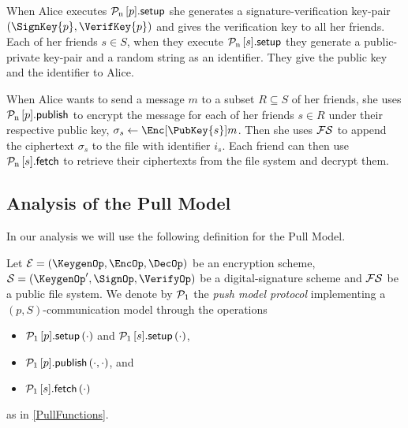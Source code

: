 When Alice executes \(\pnsetup{p}\) she generates a signature-verification 
key-pair \((\SignKey{p}, \VerifKey{p})\) and gives the verification key to all 
her friends.
Each of her friends \(s\in S\), when they execute \(\pnsetup{s}\) they generate
a public-private key-pair and a random string as an identifier.
They give the public key and the identifier to Alice.

When Alice wants to send a message \(m\) to a subset \(R\subseteq S\) of her 
friends, she uses \(\pnpub{p}\) to encrypt the message for each of her friends 
\(s\in R\) under their respective public key, \(\sigma_s\gets 
  \Enc[\PubKey{s}]{m}\).
Then she uses \(\operatorname{\mathcal{FS}}\) to append the ciphertext \(\sigma_s\) to the file with 
identifier \(i_s\).
Each friend can then use \(\pnget{s}\) to retrieve their ciphertexts from the 
file system and decrypt them.

\subsection{Analysis of the Pull Model}

In our analysis we will use the following definition for the Pull Model.

\begin{definition}\label{PullModel}
  Let \(\mathcal{E} = (\KeygenOp, \EncOp, \DecOp)\) be an encryption scheme, 
  \(\mathcal{S} = (\KeygenOp^\prime, \SignOp, \VerifyOp)\) be  
  a digital-signature scheme and \(\operatorname{\mathcal{FS}}\) be a public file system.
  We denote by \(\operatorname{\mathcal{P}_1}\) the \emph{push model protocol} implementing a \((p, 
    S)\)-communication model through the operations
  \begin{itemize}
    \item \(\psetup{p}[\cdot]\) and \(\psetup{s}[\cdot]\),
    \item \(\ppub{p}[\cdot][\cdot]\), and
    \item \(\pget{s}[\cdot]\)
  \end{itemize}
  as in \cref{PullFunctions}.
\end{definition}

